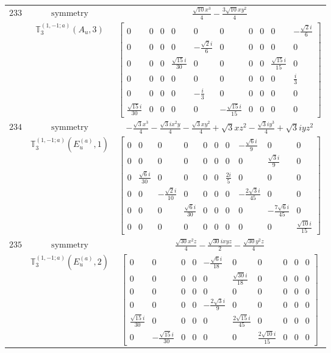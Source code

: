 \documentclass[fleqn,8pt,landscape]{jsarticle}
\begin{document}
\begin{longtable}{ccc}
$ 233 $ & $ \text{symmetry} $ & $ \frac{\sqrt{10} x^{3}}{4} - \frac{3 \sqrt{10} x y^{2}}{4} $ \\
$  $ & $ \mathbb{T}_{3}^{(1,-1;a)}(A_{u},3) $ & $ \begin{bmatrix} 0 & 0 & 0 & 0 & 0 & 0 & 0 & 0 & 0 & - \frac{\sqrt{2} i}{6} \\ 0 & 0 & 0 & 0 & - \frac{\sqrt{2} i}{6} & 0 & 0 & 0 & 0 & 0 \\ 0 & 0 & 0 & \frac{\sqrt{15} i}{30} & 0 & 0 & 0 & 0 & \frac{\sqrt{15} i}{15} & 0 \\ 0 & 0 & 0 & 0 & 0 & 0 & 0 & 0 & 0 & \frac{i}{3} \\ 0 & 0 & 0 & 0 & - \frac{i}{3} & 0 & 0 & 0 & 0 & 0 \\ \frac{\sqrt{15} i}{30} & 0 & 0 & 0 & 0 & - \frac{\sqrt{15} i}{15} & 0 & 0 & 0 & 0 \end{bmatrix} $ \\ \hline
$ 234 $ & $ \text{symmetry} $ & $ - \frac{\sqrt{3} x^{3}}{4} - \frac{\sqrt{3} i x^{2} y}{4} - \frac{\sqrt{3} x y^{2}}{4} + \sqrt{3} x z^{2} - \frac{\sqrt{3} i y^{3}}{4} + \sqrt{3} i y z^{2} $ \\
$  $ & $ \mathbb{T}_{3}^{(1,-1;a)}(E_{u}^{(a)},1) $ & $ \begin{bmatrix} 0 & 0 & 0 & 0 & 0 & 0 & 0 & - \frac{\sqrt{6} i}{9} & 0 & 0 \\ 0 & 0 & 0 & 0 & 0 & 0 & 0 & 0 & \frac{\sqrt{3} i}{9} & 0 \\ 0 & \frac{\sqrt{6} i}{30} & 0 & 0 & 0 & 0 & \frac{2 i}{5} & 0 & 0 & 0 \\ 0 & 0 & - \frac{\sqrt{2} i}{10} & 0 & 0 & 0 & 0 & - \frac{2 \sqrt{3} i}{45} & 0 & 0 \\ 0 & 0 & 0 & \frac{\sqrt{6} i}{30} & 0 & 0 & 0 & 0 & - \frac{7 \sqrt{6} i}{45} & 0 \\ 0 & 0 & 0 & 0 & 0 & 0 & 0 & 0 & 0 & \frac{\sqrt{10} i}{15} \end{bmatrix} $ \\ \hline
$ 235 $ & $ \text{symmetry} $ & $ \frac{\sqrt{30} x^{2} z}{4} - \frac{\sqrt{30} i x y z}{2} - \frac{\sqrt{30} y^{2} z}{4} $ \\
$  $ & $ \mathbb{T}_{3}^{(1,-1;a)}(E_{u}^{(a)},2) $ & $ \begin{bmatrix} 0 & 0 & 0 & 0 & - \frac{\sqrt{6} i}{18} & 0 & 0 & 0 & 0 & 0 \\ 0 & 0 & 0 & 0 & 0 & \frac{\sqrt{30} i}{18} & 0 & 0 & 0 & 0 \\ 0 & 0 & 0 & 0 & 0 & 0 & 0 & 0 & 0 & 0 \\ 0 & 0 & 0 & 0 & - \frac{2 \sqrt{3} i}{9} & 0 & 0 & 0 & 0 & 0 \\ \frac{\sqrt{15} i}{30} & 0 & 0 & 0 & 0 & \frac{2 \sqrt{15} i}{45} & 0 & 0 & 0 & 0 \\ 0 & - \frac{\sqrt{15} i}{30} & 0 & 0 & 0 & 0 & \frac{2 \sqrt{10} i}{15} & 0 & 0 & 0 \end{bmatrix} $ \\ \hline

\end{longtable}
\end{document}
